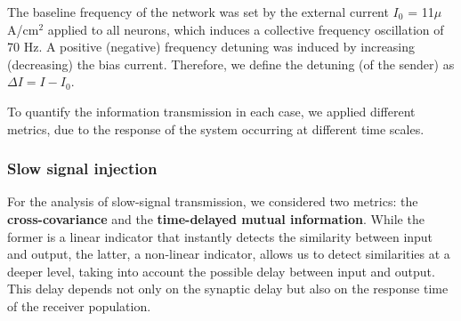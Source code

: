 \documentclass[../main.tex]{subfiles}
\begin{document}
The baseline frequency of the network was set by the external current $I_0$ = 11$\mu$A/cm$^2$ applied to all neurons, which induces a collective frequency oscillation of 70 Hz.
A positive (negative) frequency detuning was induced by increasing (decreasing) the bias current.
Therefore, we define the detuning (of the sender) as $\Delta I = I-I_0$.

To quantify the information transmission in each case, we applied different metrics, due to the response of the system occurring at different time scales.

\subsubsection{Slow signal injection}
For the analysis of slow-signal transmission, we considered two metrics: the \textbf{cross-covariance} and the \textbf{time-delayed mutual information}.
While the former is a linear indicator that instantly detects the similarity between input and output, the latter, a non-linear indicator, allows us to detect similarities at a deeper level, taking into account the possible delay between input and output.
This delay depends not only on the synaptic delay but also on the response time of the receiver population.

\end{document}
